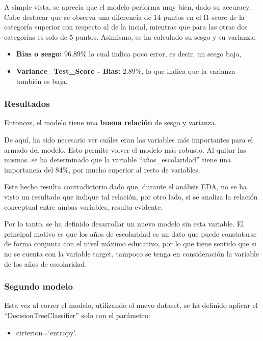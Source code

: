 \documentclass[a4paper]{article}
\begin{document}
            A simple vista, se aprecia que el modelo performa muy bien, dado su accuracy. Cabe destacar que se observa una diferencia de 14 puntos en el f1-score de la categoría superior con respecto al de la incial, mientras que para las otras dos categorías es solo de 5 puntos. Asimismo, se ha calculado su sesgo y su varianza:
            \begin{itemize}
                \item \textbf{Bias o sesgo:} 96.89\% lo cual indica poco error, es decir, un sesgo bajo,
                \item \textbf{Variance=Test\_Score - Bias:} 2.89\%, lo que indica que la varianza también es baja.
            \end{itemize}


            \subsubsection*{Resultados}

            Entonces, el modelo tiene una \textbf{buena relación} de sesgo y varianza.

            De aquí, ha sido necesario ver cuáles eran las variables más importantes para el armado del modelo. Esto permite volver el modelo más robusto. Al quitar las mismas. se ha determinado que la variable ``años\_escolaridad'' tiene una importancia del 84\%, por mucho superior al resto de variables.

            Este hecho resulta contradictorio dado que, durante el análisis EDA, no se ha visto un resultado que indique tal relación, por otro lado, si se analiza la relación conceptual entre ambas variables, resulta evidente.

            Por lo tanto, se ha definido desarrollar un nuevo modelo sin esta variable. El principal motivo es que los años de escolaridad es un dato que puede constatarse de forma conjunta con el nivel máximo educativo, por lo que tiene sentido que si no se cuenta con la variable target, tampoco se tenga en consideración la variable de los años de escolaridad.

        \subsubsection{Segundo modelo}

            Esta vez al correr el modelo, utilizando el nuevo dataset, se ha definido aplicar el ``DecisionTreeClassifier'' solo con el parámetro:
            \begin{itemize}
                \item cirterion=`entropy'.
            \end{itemize}
\end{document}
